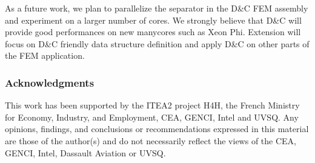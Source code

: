 \documentclass[10pt]{IOS-Book-Article}
\begin{document}
As a future work, we plan to parallelize the separator in the D\&C FEM assembly and experiment on a larger number of cores.
We strongly believe that D\&C will provide good performances on new manycores such as Xeon Phi.
Extension will focus on D\&C friendly data structure definition and apply D\&C on other parts of the FEM application. 

\subsubsection*{Acknowledgments} \scriptsize{
This work has been supported by the ITEA2 project H4H, the French Ministry for Economy,
Industry, and Employment, CEA, GENCI, Intel and UVSQ.  Any opinions,
findings, and conclusions or recommendations expressed in this
material are those of the author(s) and do not necessarily reflect the
views of the CEA, GENCI, Intel, Dassault Aviation or UVSQ.}



\end{document}
